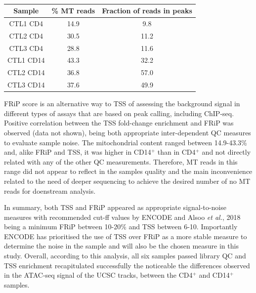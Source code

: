 \begin{table}[htbp]
\centering
\begin{tabular}{@{} c c c}
\toprule
\textbf{Sample} & \textbf{\% MT reads} & \textbf{Fraction of reads in peaks} \\
\midrule
\midrule
CTL1 CD4 & 14.9 & 9.8 \\
CTL2 CD4 & 30.5 & 11.2 \\
CTL3 CD4 & 28.8 & 11.6 \\
CTL1 CD14 & 43.3 & 32.2 \\
CTL2 CD14 & 36.8 & 57.0 \\
CTL3 CD14 & 37.6 & 49.9 \\
\bottomrule
\end{tabular}
\medskip %
\caption[ATAC-seq percentage of MT reads and fraction of reads in called peaks]{\textbf{}}
\label{tab:ATAC_MT_fraction_reads_in_peaks}
\end{table}
\bigskip %


FRiP score is an alternative way to TSS of assessing the background signal in different types of assays that are based on peak calling, including ChIP-seq. Positive correlation between the TSS fold-change enrichment and FRiP was observed (data not shown), being both appropriate inter-dependent QC measures to evaluate sample noise.  The mitochondrial content ranged between 14.9-43.3\% and, alike FRiP and TSS, it was higher in CD14$^+$ than in CD4$^+$ and not directly related with any of the other QC measurements. Therefore, MT reads in this range did not appear to reflect in the samples quality and the main inconvenience related to the need of deeper sequencing to achieve the desired number of no MT reads for doenstream analysis.

In summary, both TSS and FRiP appeared as appropriate signal-to-noise measures with recommended cut-ff values by ENCODE and Alsoo \textit{et al.}, 2018 being a minimum FRiP between 10-20\% and TSS between 6-10. Importantly ENCODE has prioritised the use of TSS over FRiP as a more stable measure to determine the noise in the sample and will also be the chosen measure in this study. Overall, according to this analysis, all six samples passed library QC and TSS enrichment recapitulated successfully the noticeable the differences observed in the ATAC-seq signal of the UCSC tracks, between the CD4$^+$ and CD14$^+$ samples.
	

